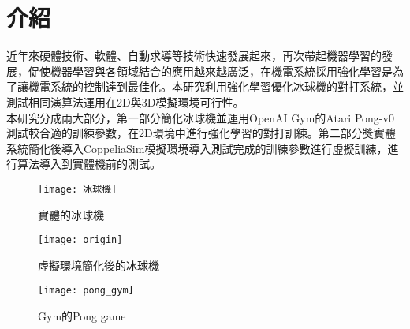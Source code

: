 \chapter{介紹}
 近年來硬體技術、軟體、自動求導等技術快速發展起來，再次帶起機器學習的發展，促使機器學習與各領域結合的應用越來越廣泛，在機電系統採用強化學習是為了讓機電系統的控制達到最佳化。本研究利用強化學習優化冰球機的對打系統，並測試相同演算法運用在2D與3D模擬環境可行性。\\

 本研究分成兩大部分，第一部分簡化冰球機並運用OpenAI Gym的Atari Pong-v0測試較合適的訓練參數，在2D環境中進行強化學習的對打訓練。第二部分獎實體系統簡化後導入CoppeliaSim模擬環境導入測試完成的訓練參數進行虛擬訓練，進行算法導入到實體機前的測試。\\

\begin{figure}[hbt!]
\begin{center}
\texttt{[image: 冰球機]}
\caption{\Large 實體的冰球機}\label{fig.冰球機}
\end{center}
\end{figure}
\begin{figure}[hbt!]
\begin{center}
\texttt{[image: origin]}
\caption{\Large 虛擬環境簡化後的冰球機}\label{fig.模擬冰球機}
\end{center}
\end{figure}
\begin{figure}[hbt!]
\begin{center}
\texttt{[image: pong\_gym]}
\caption{\Large Gym的Pong game}\label{fig.pong_gym}
\end{center}
\end{figure}
